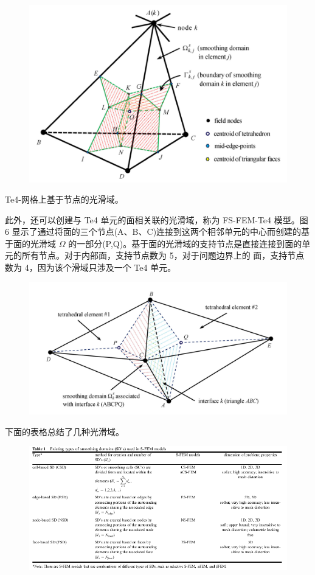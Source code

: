 \documentclass[12pt,a4paper]{article}
\begin{document}
\begin{figure}[H]
\centering
\includegraphics[scale=0.5]{./figures/5.png}
\caption{}
\end{figure}

Te4-网格上基于节点的光滑域。

此外，还可以创建与 Te4 单元的面相关联的光滑域，称为 FS-FEM-Te4 模型。图 6 显示了通过将面的三个节点(A、B、C)连接到这两个相邻单元的中心而创建的基于面的光滑域 $\Omega$ 的一部分(P,Q)。基于面的光滑域的支持节点是直接连接到面的单元的所有节点。对于内部面，支持节点数为 5，对于问题边界上的
面，支持节点数为 4，因为该个滑域只涉及一个 Te4 单元。

\begin{figure}[H]
\centering
\includegraphics[scale=0.5]{./figures/6.png}
\caption{}
\end{figure}

下面的表格总结了几种光滑域。
\begin{figure}[H]
\centering
\includegraphics[scale=0.5]{./figures/7.png}
\caption{}
\end{figure}
\end{document}
